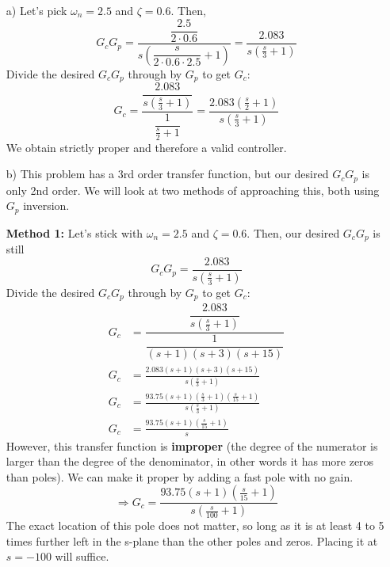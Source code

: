 \documentclass{book}
\begin{document}
\begin{enumerate}
	\item[a)] Let's pick $ \omega_n=2.5 $ and $ \zeta = 0.6 $. Then,
	\begin{equation}
		G_cG_p = \dfrac{\dfrac{2.5}{2\cdot0.6}}{s\left(\dfrac{s}{2\cdot0.6\cdot2.5}+1\right)} = \frac{2.083}{s\left(\frac{s}{3}+1\right)}
	\end{equation}
	Divide the desired $ G_cG_p $ through by $ G_p $ to get $ G_c $:
	\begin{equation}
		G_c = \dfrac{\dfrac{2.083}{s\left(\frac{s}{3}+1\right)}}{
		\dfrac{1}{\frac{s}{2}+1}} = \dfrac{2.083\left(\frac{s}{2}+1\right)}{s\left(\frac{s}{3}+1\right)}
	\end{equation}
	We obtain strictly proper and therefore a valid controller.
	
	\item[b)] This problem has a 3rd order transfer function, but our desired $ G_c G_p $ is only 2nd order. We will look at two methods of approaching this, both using $ G_p $ inversion.
	
	\textbf{Method 1:} Let's stick with $ \omega_n=2.5 $ and $ \zeta = 0.6 $. Then, our desired $ G_cG_p $ is still
	\begin{equation}
		G_cG_p = \frac{2.083}{s\left(\frac{s}{3}+1\right)}
	\end{equation}
	Divide the desired $ G_cG_p $ through by $ G_p $ to get $ G_c $:
	\begin{align*}
		G_c & = \dfrac{\dfrac{2.083}{s\left(\frac{s}{3}+1\right)}}{\dfrac{1}{(s+1)(s+3)(s+15)}} \\
		G_c & = \frac{2.083(s+1)(s+3)(s+15)}{s\left(\frac{s}{3}+1\right)} \\
		G_c & = \frac{93.75(s+1)\left(\frac{s}{3}+1\right)\left(\frac{s}{15}+1\right)}{s\left(\frac{s}{3}+1\right)} \\
		G_c & = \frac{93.75(s+1)\left(\frac{s}{15}+1\right)}{s}
	\end{align*}
	However, this transfer function is \textbf{improper} (the degree of the numerator is larger than the degree of the denominator, in other words it has more zeros than poles). We can make it proper by adding a fast pole with no gain.
	\begin{equation}
		\Rightarrow G_c = \frac{93.75(s+1)\left(\frac{s}{15}+1\right)}{s\left(\frac{s}{100}+1\right)}
	\end{equation}
	The exact location of this pole does not matter, so long as it is at least 4 to 5 times further left in the s-plane than the other poles and zeros. Placing it at $ s=-100 $ will suffice.
	

\end{enumerate}
\end{document}
